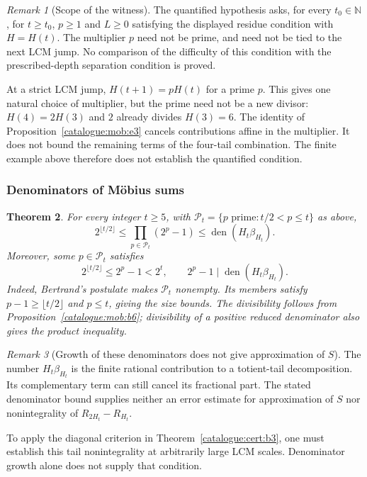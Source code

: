 \documentclass[11pt]{article}
\theoremstyle{plain}
\newtheorem{thm}{Theorem}[section]
\theoremstyle{definition}
\theoremstyle{remark}
\newtheorem{rem}[thm]{Remark}
\begin{document}
\begin{rem}[Scope of the witness]
The quantified hypothesis asks, for every $t_0\in\mathbb N$, for
$t\ge t_0$, $p\ge1$ and $L\ge0$ satisfying the displayed residue
condition with $H=H(t)$. The multiplier $p$ need not be prime, and need
not be tied to the next LCM jump. No comparison of the difficulty of
this condition with the prescribed-depth separation condition is proved.

At a strict LCM jump, $H(t+1)=pH(t)$ for a prime $p$. This gives one
natural choice of multiplier, but the prime need not be a new divisor:
$H(4)=2H(3)$ and $2$ already divides $H(3)=6$.
The identity of Proposition~\ref{catalogue:mob:e3}
cancels contributions affine in the multiplier. It does not bound the
remaining terms of the four-tail combination. The finite example above
therefore does not establish the quantified condition.
\end{rem}

\subsubsection{Denominators of M\"obius sums}

\begin{thm}\label{thm:denominators-mobius-sums}
For every integer $t\ge5$, with
$\mathcal P_t=\{p\text{ prime}:t/2<p\le t\}$ as above,
\[
 2^{\lfloor t/2\rfloor}
 \le\prod_{p\in\mathcal P_t}(2^p-1)
 \le\operatorname{den}(H_t\beta_{H_t}).
\]
Moreover, some $p\in\mathcal P_t$ satisfies
\[
 2^{\lfloor t/2\rfloor}\le2^p-1<2^t,
 \qquad 2^p-1\mid\operatorname{den}(H_t\beta_{H_t}).
\]
Indeed, Bertrand's postulate makes $\mathcal P_t$ nonempty. Its members
satisfy $p-1\ge\lfloor t/2\rfloor$ and $p\le t$, giving the size
bounds. The divisibility follows from
Proposition~\ref{catalogue:mob:b6}; divisibility of a positive reduced
denominator also gives the product inequality.
\end{thm}

\begin{rem}[Growth of these denominators does not give approximation of $S$]
The number $H_t\beta_{H_t}$ is the finite rational contribution to a
totient-tail decomposition. Its complementary term can still cancel
its fractional part. The stated denominator bound supplies neither an
error estimate for approximation of $S$ nor nonintegrality of
$R_{2H_t}-R_{H_t}$.

To apply the diagonal criterion in Theorem~\ref{catalogue:cert:b3},
one must establish this tail nonintegrality at arbitrarily large LCM
scales. Denominator growth alone does not supply that condition.
\end{rem}
\end{document}
